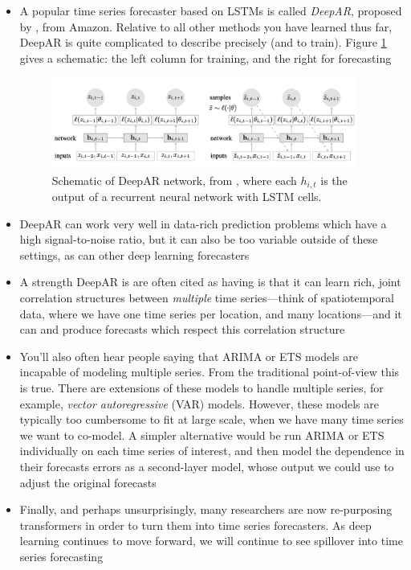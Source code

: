 \documentclass{article}
\begin{document}
\begin{itemize}
\item A popular time series forecaster based on LSTMs is called \emph{DeepAR},
  proposed by \citet{salinas2020deep}, from Amazon. Relative to all other
  methods you have learned thus far, DeepAR is quite complicated to describe
  precisely (and to train). Figure \ref{fig:deepar} gives a schematic: the left
  column for training, and the right for forecasting

\begin{figure}[htb]
\centering
\includegraphics[width=0.95\textwidth]{deepar.png}
\caption{Schematic of DeepAR network, from \citet{salinas2020deep}, where each
  $h_{i,t}$ is the output of a recurrent neural network with LSTM cells.} 
\label{fig:deepar}
\end{figure}

\item DeepAR can work very well in data-rich prediction problems which have a 
  high signal-to-noise ratio, but it can also be too variable outside of these
  settings, as can other deep learning forecasters  

\item A strength DeepAR is are often cited as having is that it can learn rich,
  joint correlation structures between \emph{multiple} time series---think of  
  spatiotemporal data, where we have one time series per location, and many 
  locations---and it can and produce forecasts which respect this correlation
  structure 

\item You'll also often hear people saying that ARIMA or ETS models are
  incapable of modeling multiple series. From the traditional point-of-view this
  is true. There are extensions of these models to handle multiple series, for
  example, \emph{vector autoregressive} (VAR) models. However, these models are
  typically too cumbersome to fit at large scale, when we have many time series
  we want to co-model. A simpler alternative would be run ARIMA or ETS
  individually on each time series of interest, and then model the dependence in 
  their forecasts errors as a second-layer model, whose output we could use to 
  adjust the original forecasts

\item Finally, and perhaps unsurprisingly, many researchers are now re-purposing
  transformers in order to turn them into time series forecasters. As deep 
  learning continues to move forward, we will continue to see spillover into
  time series forecasting   
\end{itemize}
\end{document}
